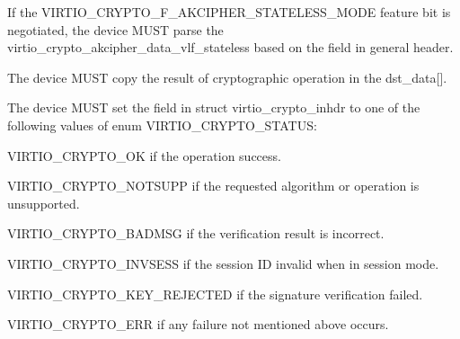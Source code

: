 \begin{itemize*}
\item If the VIRTIO_CRYPTO_F_AKCIPHER_STATELESS_MODE feature bit is negotiated, the
    device MUST parse the virtio_crypto_akcipher_data_vlf_stateless based on the 
    field in general header.
\item The device MUST copy the result of cryptographic operation in the dst_data[].
\item The device MUST set the  field in struct virtio_crypto_inhdr to
    one of the following values of enum VIRTIO_CRYPTO_STATUS:
\begin{itemize*}
\item VIRTIO_CRYPTO_OK if the operation success.
\item VIRTIO_CRYPTO_NOTSUPP if the requested algorithm or operation is unsupported.
\item VIRTIO_CRYPTO_BADMSG if the verification result is incorrect.
\item VIRTIO_CRYPTO_INVSESS if the session ID invalid when in session mode.
\item VIRTIO_CRYPTO_KEY_REJECTED if the signature verification failed.
\item VIRTIO_CRYPTO_ERR if any failure not mentioned above occurs.
\end{itemize*}
\end{itemize*}
